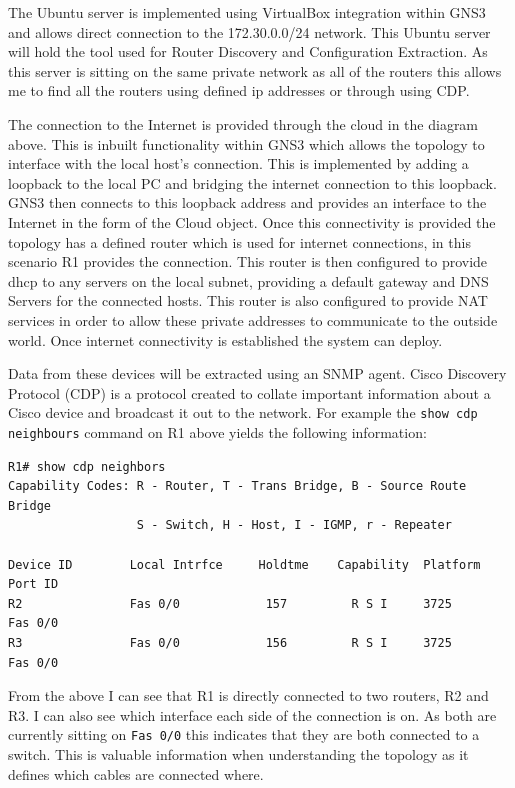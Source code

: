 \documentclass[11pt]{report}
\begin{document}
The Ubuntu server is implemented using VirtualBox integration within GNS3 and allows direct connection to the 172.30.0.0/24 network. This Ubuntu server will hold the tool used for Router Discovery and Configuration Extraction. As this server is sitting on the same private network as all of the routers this allows me to find all the routers using defined ip addresses or through using CDP.

The connection to the Internet is provided through the cloud in the diagram above. This is inbuilt functionality within GNS3 which allows the topology to interface with the local host’s connection. This is implemented by adding a loopback to the local PC and bridging the internet connection to this loopback. GNS3 then connects to this loopback address and provides an interface to the Internet in the form of the Cloud object. Once this connectivity is provided the topology has a defined router which is used for internet connections, in this scenario R1 provides the connection. This router is then configured to provide dhcp to any servers on the local subnet, providing a default gateway and DNS Servers for the connected hosts. This router is also configured to provide NAT services in order to allow these private addresses to communicate to the outside world. Once internet connectivity is established the system can deploy.

Data from these devices will be extracted using an SNMP agent. Cisco Discovery Protocol (CDP) is a protocol created to collate important information about a Cisco device and broadcast it out to the network. For example the {\tt show cdp neighbours} command on R1 above yields the following information:

\begin{lstlisting}
R1# show cdp neighbors
Capability Codes: R - Router, T - Trans Bridge, B - Source Route Bridge
                  S - Switch, H - Host, I - IGMP, r - Repeater

Device ID        Local Intrfce     Holdtme    Capability  Platform  Port ID
R2               Fas 0/0            157         R S I     3725      Fas 0/0
R3               Fas 0/0            156         R S I     3725      Fas 0/0
\end{lstlisting}

From the above I can see that R1 is directly connected to two routers, R2 and R3. I can also see which interface each side of the connection is on. As both are currently sitting on {\tt Fas 0/0} this indicates that they are both connected to a switch. This is valuable information when understanding the topology as it defines which cables are connected where.
\end{document}

